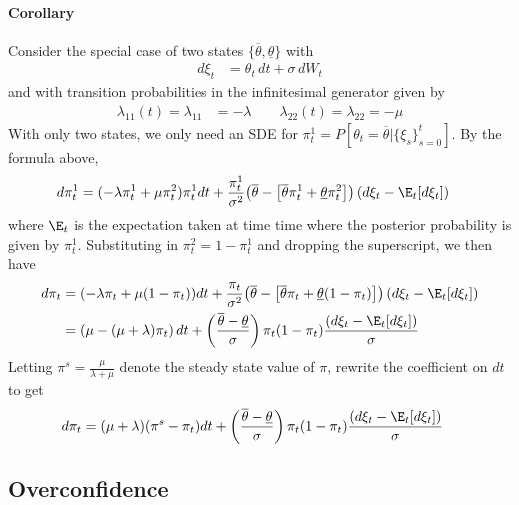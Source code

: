 \documentclass[12pt]{article}
\theoremstyle{plain}
\theoremstyle{definition}
\theoremstyle{remark}
\begin{document}
\paragraph{Corollary}
Consider the special case of two states
$\{\overline{\theta}, \underline{\theta}\}$ with
\begin{align*}
  d\xi_t
  &= \theta_t \, dt + \sigma \,dW_t
\end{align*}
and with transition probabilities in the infinitesimal generator given
by
\begin{align*}
  \lambda_{11}(t)
  = \lambda_{11}
  &= -\lambda
  \qquad
  \lambda_{22}(t)
  = \lambda_{22}
  = -\mu
\end{align*}
With only two states, we only need an SDE for
$\pi_t^1=P[\theta_t=\overline{\theta}|\{\xi_s\}_{s=0}^t]$.
By the formula above,
\begin{align*}
  d\pi_t^1
  &=
  (
  -\lambda\pi_t^1 + \mu\pi_t^2
  )
  \pi_t^1
  dt
  +
  \frac{\pi_t^1}{\sigma^2}
  \big(
  \overline{\theta}
  - \big[\overline{\theta}\pi_t^1 + \underline{\theta}\pi_t^2\big]
  \big)
  \left(
  d\xi_t
  -
  \E_t[d\xi_t]
  \right)
\end{align*}
where $\E_t$ is the expectation taken at time time where the posterior
probability is given by $\pi_t^1$.
Substituting in $\pi_t^2=1-\pi_t^1$ and dropping the superscript, we
then have
\begin{align*}
  d\pi_t
  &=
  (
  -\lambda\pi_t + \mu(1-\pi_t)
  )
  dt
  +
  \frac{\pi_t}{\sigma^2}
  \big(
  \overline{\theta}
  - \big[\overline{\theta}\pi_t + \underline{\theta}(1-\pi_t)\big]
  \big)
  \left(
  d\xi_t
  -
  \E_t[d\xi_t]
  \right)
  \\
  &=
  (
  \mu-(\mu+\lambda)\pi_t
  )
  \,dt
  +
  \left(
  \frac{\overline{\theta} - \underline{\theta}}{\sigma}
  \right)
  \pi_t(1-\pi_t)
  \frac{\left( d\xi_t - \E_t[d\xi_t] \right)}{\sigma}
\end{align*}
Letting $\pi^s = \frac{\mu}{\lambda+\mu}$ denote the steady state value
of $\pi$, rewrite the coefficient on $dt$ to get
\begin{align*}
  d\pi_t
  &=
  (\mu+\lambda)(\pi^s-\pi_t)
  dt
  +
  \left(
  \frac{\overline{\theta} - \underline{\theta}}{\sigma}
  \right)
  \pi_t(1-\pi_t)
  \frac{\left( d\xi_t - \E_t[d\xi_t] \right)}{\sigma}
\end{align*}


\clearpage
\subsection{Overconfidence}
\end{document}
